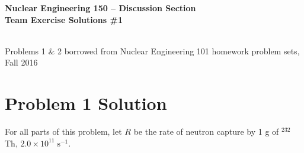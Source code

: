 \documentclass{report}
\begin{document}
\begin{center}
\textbf{\large Nuclear Engineering 150 -- Discussion Section}\\ 
\textbf{Team Exercise Solutions \#1}

\-\\
{\small *Problems 1 \& 2 borrowed from Nuclear Engineering 101 homework problem sets, Fall 2016}
\end{center}




\section*{Problem 1 Solution}


For all parts of this problem, let $R$ be the rate of neutron capture by 1 g of $^{232}$Th, $2.0 \times 10^{11} \;\text{s}^{-1}$.\\
\end{document}
